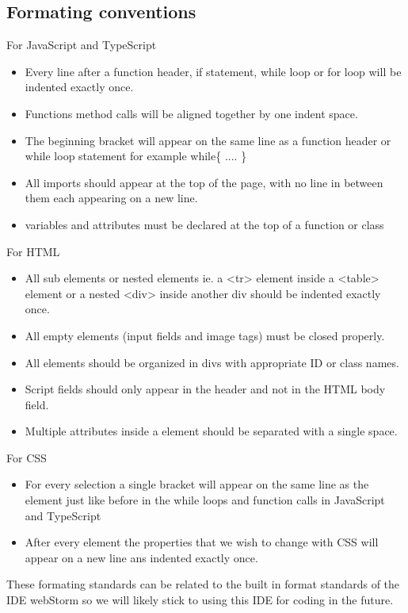 \documentclass[a4paper]{article}
\begin{document}
\subsection{Formating conventions}
For JavaScript and TypeScript
\begin{itemize}
\item Every line after a function header, if statement, while loop or for loop will be indented exactly once.
\item Functions method calls will be aligned together by one indent space.
\item The beginning bracket will appear on the same line as a function header or while loop statement for example while{\{}
\newline.... {\}}
\item All imports should appear at the top of the page, with no line in between them each appearing on a new line.
\item variables and attributes must be declared at the top of a function or class
\end{itemize}
For HTML
\begin{itemize}
\item All sub elements or nested elements ie. a <tr> element inside a <table> element or a nested <div> inside another div should be indented exactly once.
\item All empty elements (input fields and image tags) must be closed properly.
\item All elements should be organized in divs with appropriate ID or class names.
\item Script fields should only appear in the header and not in the HTML body field.
\item Multiple attributes inside a element should be separated with a single space.
\end{itemize}
For CSS
\begin{itemize}
\item For every selection a single bracket will appear on the same line as the element just like before in the while loops and function calls in JavaScript and TypeScript
\item After every element the properties that we wish to change with CSS will appear on a new line ans indented exactly once.
\end{itemize}
These formating standards can be related to the built in format standards of the IDE webStorm so we will likely stick to using this IDE for coding in the future.
\end{document}
